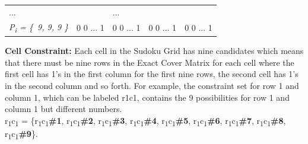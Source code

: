 \documentclass[a4paper,oneside,11pt]{report}
\newcounter{row}
\newcounter{col}
\begin{document}
\begin{tabular}{m{2.5cm} m{3cm} m{3cm} m{3cm} m{3cm}}
\hspace{0.7cm}... & &\hspace{2cm} ... & & \\
{\itshape P\textsubscript{i} = \{\ 9, 9, 9 \}} & 0\hspace{0.5cm} 0\hspace{0.5cm} ... \hspace{0.2cm} 1 & 0\hspace{0.5cm} 0\hspace{0.3cm} ... \hspace{0.5cm} 1 & 0\hspace{0.7cm} 0\hspace{0.5cm} ... \hspace{0.3cm} 1 & 0\hspace{0.7cm} 0\hspace{0.5cm} ... \hspace{0.3cm} 1\\ 
\end{tabular}
\newline
\newline

\textbf{Cell Constraint:} Each cell in the Sudoku Grid has nine candidates which means that there must be nine rows in the Exact Cover Matrix for each cell where the first cell has 1’s in the first column for the first nine rows, the second cell has 1’s in the second column and so forth.  For example, the constraint set for row 1 and column 1, which can be labeled r1c1, contains the 9 possibilities for row 1 and column 1 but different numbers.\\
r\textsubscript{1}c\textsubscript{1} = \{r\textsubscript{1}c\textsubscript{1}\textbf{\#1}, r\textsubscript{1}c\textsubscript{1}\textbf{\#2}, r\textsubscript{1}c\textsubscript{1}\textbf{\#3}, r\textsubscript{1}c\textsubscript{1}\textbf{\#4}, r\textsubscript{1}c\textsubscript{1}\textbf{\#5}, r\textsubscript{1}c\textsubscript{1}\textbf{\#6}, r\textsubscript{1}c\textsubscript{1}\textbf{\#7}, r\textsubscript{1}c\textsubscript{1}\textbf{\#8}, r\textsubscript{1}c\textsubscript{1}\textbf{\#9}\}.\\
\end{document}
